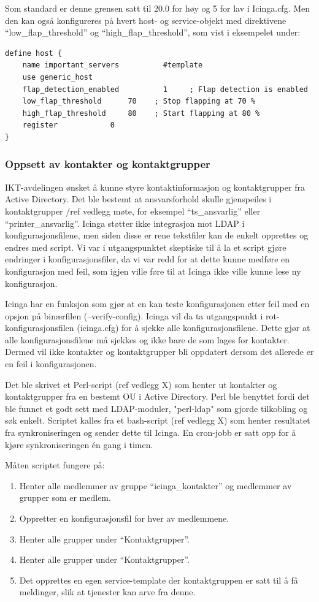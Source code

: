 Som standard er denne grensen satt til 20.0 for høy og 5 for lav i Icinga.cfg. Men den kan også konfigureres på hvert host- og service-objekt med direktivene “low\_flap\_threshold” og “high\_flap\_threshold”, som vist i eksempelet under:

\begin{lstlisting}
define host {
	name important_servers  		#template
	use generic_host
	flap_detection_enabled          1     ; Flap detection is enabled
	low_flap_threshold		70    ; Stop flapping at 70 %
	high_flap_threshold		80    ; Start flapping at 80 %
	register			0
}
\end{lstlisting}

\subsubsection{Oppsett av kontakter og kontaktgrupper}


IKT-avdelingen ønsket å kunne styre kontaktinformasjon og kontaktgrupper fra Active Directory. Det ble bestemt at ansvarsforhold skulle gjenspeiles i kontaktgrupper /ref {vedlegg møte}, for eksempel “ts\_ansvarlig” eller “printer\_ansvarlig”. Icinga støtter ikke integrasjon mot LDAP i konfigurasjonsfilene, men siden disse er rene tekstfiler kan de enkelt opprettes og endres med script. Vi var i utgangspunktet skeptiske til å la et script gjøre endringer i konfigurasjonsfiler, da vi var redd for at dette kunne medføre en konfigurasjon med feil, som igjen ville føre til at Icinga ikke ville kunne lese ny konfigurasjon. 

Icinga har en funksjon som gjør at en kan teste konfigurasjonen etter feil med en opsjon på binærfilen (--verify-config). Icinga vil da ta utgangspunkt i rot-konfigurasjonsfilen (icinga.cfg) for å sjekke alle konfigurasjonsfilene. Dette gjør at alle konfigurasjonsfilene må sjekkes og ikke bare de som lages for kontakter. Dermed vil ikke kontakter og kontaktgrupper bli oppdatert dersom det allerede er en feil i konfigurasjonen. 

Det ble skrivet et Perl-script (ref vedlegg X) som henter ut kontakter og kontaktgrupper fra en bestemt OU i Active Directory. Perl ble benyttet fordi det ble funnet et godt sett med LDAP-moduler, "perl-ldap" \cite{http://ldap.perl.org} som gjorde tilkobling og søk enkelt. Scriptet kalles fra et bash-script (ref vedlegg X) som henter resultatet fra synkroniseringen og sender dette til Icinga. En cron-jobb er satt opp for å kjøre synkroniseringen én gang i timen.

Måten scriptet fungere på:
\begin{enumerate}
	\item Henter alle medlemmer av gruppe “icinga\_kontakter” og medlemmer av grupper som er medlem.
	\item Oppretter en konfigurasjonsfil for hver av medlemmene.
	\item Henter alle grupper under “Kontaktgrupper”.
	\item Henter alle grupper under “Kontaktgrupper”.
	\item Det opprettes en egen service-template der kontaktgruppen er satt til å få meldinger, slik at tjenester kan arve fra denne.
\end{enumerate}

